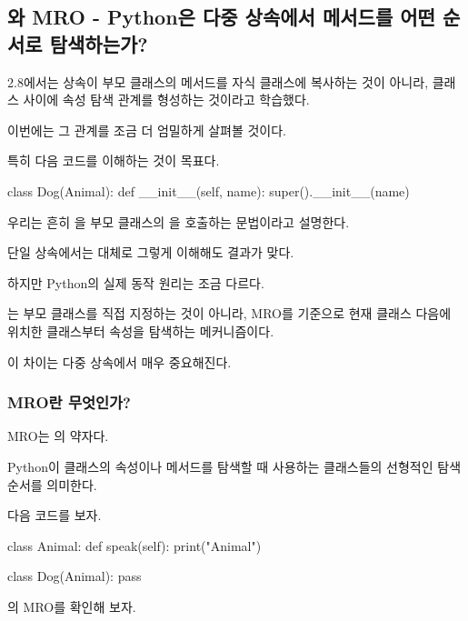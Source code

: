 

\subsection{와 MRO - Python은 다중 상속에서 메서드를 어떤 순서로 탐색하는가?}

2.8에서는 상속이 부모 클래스의 메서드를 자식 클래스에 복사하는 것이 아니라, 클래스 사이에 속성 탐색 관계를 형성하는 것이라고 학습했다.

이번에는 그 관계를 조금 더 엄밀하게 살펴볼 것이다.

특히 다음 코드를 이해하는 것이 목표다.

\begin{dhkcode}
class Dog(Animal):
    def __init__(self, name):
        super().__init__(name)
\end{dhkcode}

우리는 흔히 을 부모 클래스의 을 호출하는 문법이라고 설명한다.

단일 상속에서는 대체로 그렇게 이해해도 결과가 맞다.

하지만 Python의 실제 동작 원리는 조금 다르다.

는 부모 클래스를 직접 지정하는 것이 아니라, MRO를 기준으로 현재 클래스 다음에 위치한 클래스부터 속성을 탐색하는 메커니즘이다.

이 차이는 다중 상속에서 매우 중요해진다.

\subsubsection{MRO란 무엇인가?}

MRO는 의 약자다.

Python이 클래스의 속성이나 메서드를 탐색할 때 사용하는 클래스들의 선형적인 탐색 순서를 의미한다.

다음 코드를 보자.

\begin{dhkcode}
class Animal:
    def speak(self):
        print("Animal")


class Dog(Animal):
    pass
\end{dhkcode}

의 MRO를 확인해 보자.

